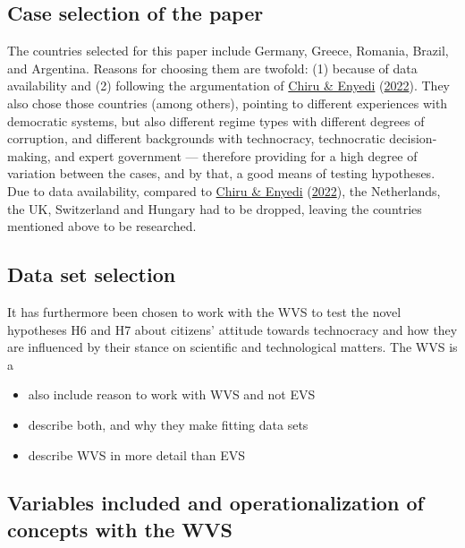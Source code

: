 \documentclass[
  12pt,
  english,
]{article}
\providecommand{\tightlist}{%
  \setlength{\itemsep}{0pt}\setlength{\parskip}{0pt}}
\begin{document}
\hypertarget{case-selection-of-the-paper}{%
\subsection{Case selection of the
paper}\label{case-selection-of-the-paper}}

The countries selected for this paper include Germany, Greece, Romania,
Brazil, and Argentina. Reasons for choosing them are twofold: (1)
because of data availability and (2) following the argumentation of
\protect\hyperlink{ref-chiru2022wants}{Chiru \& Enyedi}
(\protect\hyperlink{ref-chiru2022wants}{2022}). They also chose those
countries (among others), pointing to different experiences with
democratic systems, but also different regime types with different
degrees of corruption, and different backgrounds with technocracy,
technocratic decision-making, and expert government --- therefore
providing for a high degree of variation between the cases, and by that,
a good means of testing hypotheses. Due to data availability, compared
to \protect\hyperlink{ref-chiru2022wants}{Chiru \& Enyedi}
(\protect\hyperlink{ref-chiru2022wants}{2022}), the Netherlands, the UK,
Switzerland and Hungary had to be dropped, leaving the countries
mentioned above to be researched.

\hypertarget{data-set-selection}{%
\subsection{Data set selection}\label{data-set-selection}}

It has furthermore been chosen to work with the WVS to test the novel
hypotheses H6 and H7 about citizens' attitude towards technocracy and
how they are influenced by their stance on scientific and technological
matters. The WVS is a

\begin{itemize}
\tightlist
\item
  also include reason to work with WVS and not EVS
\item
  describe both, and why they make fitting data sets
\item
  describe WVS in more detail than EVS
\end{itemize}

\hypertarget{variables-included-and-operationalization-of-concepts-with-the-wvs}{%
\subsection{Variables included and operationalization of concepts with
the
WVS}\label{variables-included-and-operationalization-of-concepts-with-the-wvs}}
\end{document}
